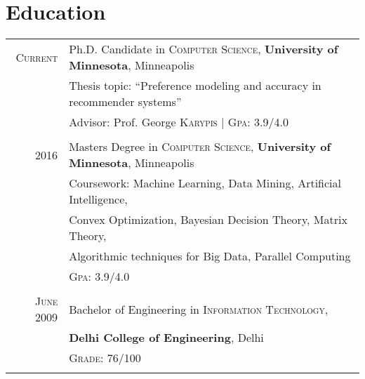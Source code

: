 \documentclass[a4paper,10pt]{article}
\begin{document}
\section{Education}
\begin{tabular}{r|l}	
 \textsc{Current}  & Ph.D. Candidate in \textsc{Computer Science},
  \textbf{University of Minnesota}, Minneapolis\\
 & Thesis topic: ``Preference modeling and accuracy in
  recommender systems''\\
  & \small Advisor: Prof. George
  \textsc{Karypis} | \normalsize \textsc{Gpa}: 3.9/4.0  \\\multicolumn{2}{c}{}\\

  \textsc{2016} & Masters Degree in \textsc{Computer Science},
  \textbf{University of Minnesota}, Minneapolis \\
                     &Coursework: Machine Learning, Data Mining, Artificial
  Intelligence,  \\
                   &Convex Optimization, Bayesian Decision Theory, Matrix
  Theory, \\ 
  &Algorithmic techniques for Big Data, Parallel Computing \\
                     &\normalsize \textsc{Gpa}: 3.9/4.0 \\
                   \multicolumn{2}{c}{}\\ %

   
   \textsc{June} 2009& Bachelor of Engineering in \textsc{Information
      Technology}, \\
      &\textbf{Delhi College of Engineering}, Delhi\\
&\textsc{Grade}: 76/100\\ %
\multicolumn{2}{c}{}\\
\end{tabular}
\end{document}
